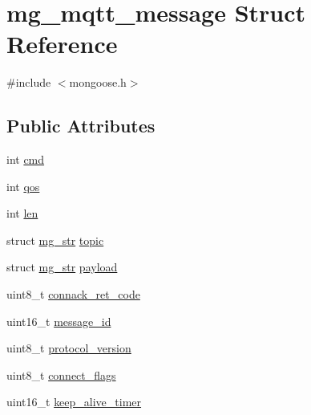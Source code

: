 \hypertarget{structmg__mqtt__message}{}\section{mg\+\_\+mqtt\+\_\+message Struct Reference}
\label{structmg__mqtt__message}


{\ttfamily \#include $<$mongoose.\+h$>$}

\subsection*{Public Attributes}
\begin{DoxyCompactItemize}
\item 
int \hyperlink{structmg__mqtt__message_abfc247fa4aaf411b0957e71df6f6ce2b_abfc247fa4aaf411b0957e71df6f6ce2b}{cmd}
\item 
int \hyperlink{structmg__mqtt__message_a5c5bca3da240c7a3cbc7bef8b67bc90e_a5c5bca3da240c7a3cbc7bef8b67bc90e}{qos}
\item 
int \hyperlink{structmg__mqtt__message_a5ac9625e8214e6a3ac6c835f19b3a9c8_a5ac9625e8214e6a3ac6c835f19b3a9c8}{len}
\item 
struct \hyperlink{structmg__str}{mg\+\_\+str} \hyperlink{structmg__mqtt__message_ac121d4016c13ad0387409feee1ebc666_ac121d4016c13ad0387409feee1ebc666}{topic}
\item 
struct \hyperlink{structmg__str}{mg\+\_\+str} \hyperlink{structmg__mqtt__message_a12215d63bfcd1341849add871ef0efc7_a12215d63bfcd1341849add871ef0efc7}{payload}
\item 
uint8\+\_\+t \hyperlink{structmg__mqtt__message_a4a6ff07b1d3fb2f06de4422d13e8e1ec_a4a6ff07b1d3fb2f06de4422d13e8e1ec}{connack\+\_\+ret\+\_\+code}
\item 
uint16\+\_\+t \hyperlink{structmg__mqtt__message_aa62fb03efa898fe46058b34e6031f8db_aa62fb03efa898fe46058b34e6031f8db}{message\+\_\+id}
\item 
uint8\+\_\+t \hyperlink{structmg__mqtt__message_a28adc3153ad7cca48588a73297dff2b4_a28adc3153ad7cca48588a73297dff2b4}{protocol\+\_\+version}
\item 
uint8\+\_\+t \hyperlink{structmg__mqtt__message_a74388e94b78a4aed9260dc2c4d4da5da_a74388e94b78a4aed9260dc2c4d4da5da}{connect\+\_\+flags}
\item 
uint16\+\_\+t \hyperlink{structmg__mqtt__message_a79e6436df92ae92c88cd99150c27f8c7_a79e6436df92ae92c88cd99150c27f8c7}{keep\+\_\+alive\+\_\+timer}
\item 

\end{DoxyCompactItemize}
